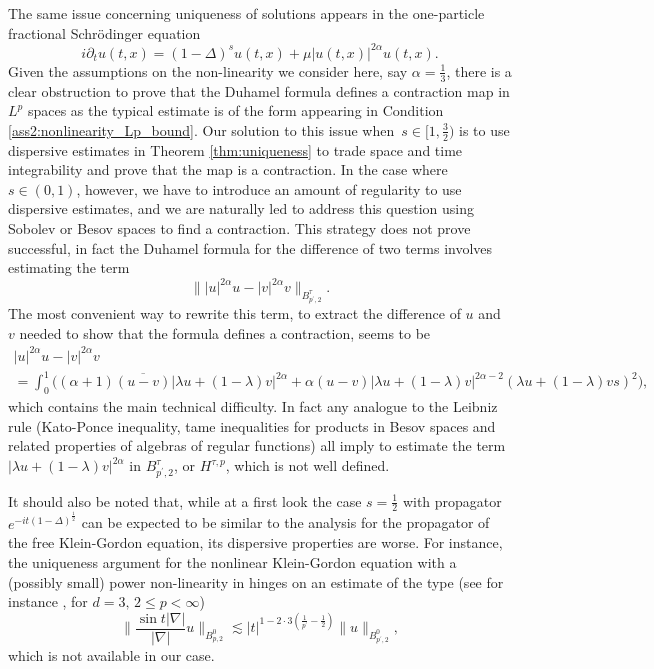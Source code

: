 \documentclass[12pt,a4paper]{amsart}
\numberwithin{equation}{section}
\begin{document}
	The same issue concerning uniqueness of solutions appears in the one-particle fractional Schr\"odinger equation
	\begin{equation}
		\label{eq:1particle_FRNLS}
		i \partial_t u(t,x) = (1-\Delta)^{s} u(t,x) + \mu | u(t,x) |^{2 \alpha} u(t,x). 
	\end{equation}
	Given the assumptions on the non-linearity we consider here, say $ \alpha = \frac13 $, there is a clear obstruction to prove that the Duhamel formula defines a contraction map in $L^p$ spaces as the typical estimate is of the form appearing in Condition \ref{ass2:nonlinearity_Lp_bound}. Our solution to this issue when~$s\in[1,\frac32)$ is to use dispersive estimates in Theorem \ref{thm:uniqueness} to trade space and time integrability and prove that the map is a contraction. In the case where $s \in (0,1) $, however, we have to introduce an amount of regularity to use dispersive estimates, and we are naturally led to address this question using Sobolev or Besov spaces to find a contraction. This strategy does not prove successful, in fact the Duhamel formula for the difference of two terms involves estimating the term
	\begin{equation}
		\| | u |^{2 \alpha} u - | v |^{2 \alpha} v \|_{B^{\tau}_{p^\prime,2}} .
	\end{equation}
	The most convenient way to rewrite this term, to extract the difference of $u$ and $v$ needed to show that the formula defines a contraction, seems to be %
	\begin{multline}
		| u |^{2 \alpha} u - | v |^{2 \alpha} v \\ 
		= \int_{0}^{1} \big( (\alpha+1) \overline{(u-v)} |\lambda u + (1-\lambda) v |^{2 \alpha} + \alpha (u-v) |\lambda u + (1-\lambda) v |^{2\alpha-2} (\lambda u + (1-\lambda) v s)^2 \big),
	\end{multline}
	which contains the main technical difficulty. In fact any analogue to the Leibniz rule (Kato-Ponce inequality, tame inequalities for products in Besov spaces and related properties of algebras of regular functions) all imply to estimate the term $ |\lambda u + (1-\lambda) v |^{2 \alpha} $ in $B^{\tau}_{p^\prime,2}$, or $H^{\tau,p}$, which is not well defined.
	
	It should also be noted that, while at a first look the case $ s= \frac12 $ with propagator $ e^{-it(1-\Delta)^\frac12} $ can be expected to be similar to the analysis for the propagator of the free Klein-Gordon equation, its dispersive properties are worse. For instance, the uniqueness argument for the nonlinear Klein-Gordon equation with a (possibly small) power non-linearity in \cite{GINIBRE198915} hinges on an estimate of the type (see for instance \cite{brenner1975p}, for $d = 3, \, 2 \leq p < \infty $)%
	\begin{equation}
		\Big\| \frac{\sin{t|\nabla|}}{|\nabla|} u \Big\|_{B^{0}_{p,2}} \lesssim |t|^{1-2 \cdot 3 (\tfrac{1}{p^\prime} - \tfrac{1}{2})} \|  u \|_{B^{0}_{p^\prime,2}} ,
	\end{equation}
	which is not available in our case.
	
\end{document}
